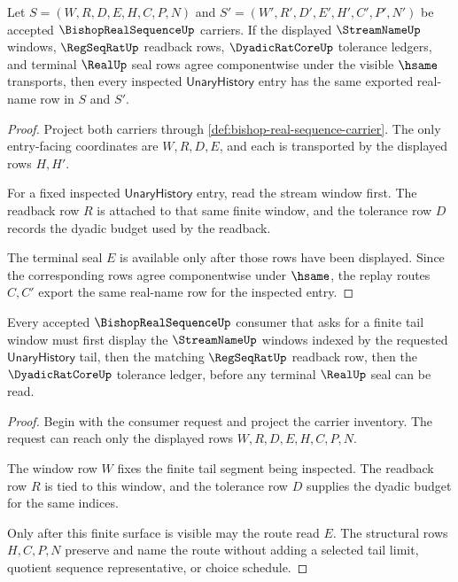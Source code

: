 \begin{theorem}
\label{thm:bishop-real-sequence-pointwise-stability}
Let $S=(W,R,D,E,H,C,P,N)$ and $S'=(W',R',D',E',H',C',P',N')$ be accepted $\BishopRealSequenceUp$ carriers. If the displayed $\StreamNameUp$ windows, $\RegSeqRatUp$ readback rows, $\DyadicRatCoreUp$ tolerance ledgers, and terminal $\RealUp$ seal rows agree componentwise under the visible $\hsame$ transports, then every inspected $\mathsf{UnaryHistory}$ entry has the same exported real-name row in $S$ and $S'$.
\end{theorem}
\begin{proof}
Project both carriers through \autoref{def:bishop-real-sequence-carrier}. The only entry-facing coordinates are $W,R,D,E$, and each is transported by the displayed rows $H,H'$.

For a fixed inspected $\mathsf{UnaryHistory}$ entry, read the stream window first. The readback row $R$ is attached to that same finite window, and the tolerance row $D$ records the dyadic budget used by the readback.

The terminal seal $E$ is available only after those rows have been displayed. Since the corresponding rows agree componentwise under $\hsame$, the replay routes $C,C'$ export the same real-name row for the inspected entry.
\end{proof}

\begin{theorem}
\label{thm:bishop-real-sequence-tail-window}
Every accepted $\BishopRealSequenceUp$ consumer that asks for a finite tail window must first display the $\StreamNameUp$ windows indexed by the requested $\mathsf{UnaryHistory}$ tail, then the matching $\RegSeqRatUp$ readback row, then the $\DyadicRatCoreUp$ tolerance ledger, before any terminal $\RealUp$ seal can be read.
\end{theorem}
\begin{proof}
Begin with the consumer request and project the carrier inventory. The request can reach only the displayed rows $W,R,D,E,H,C,P,N$.

The window row $W$ fixes the finite tail segment being inspected. The readback row $R$ is tied to this window, and the tolerance row $D$ supplies the dyadic budget for the same indices.

Only after this finite surface is visible may the route read $E$. The structural rows $H,C,P,N$ preserve and name the route without adding a selected tail limit, quotient sequence representative, or choice schedule.
\end{proof}

